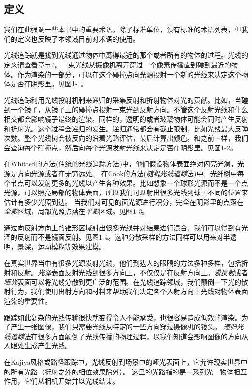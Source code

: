\documentclass[12pt]{article}
\begin{document}
\subsection{定义}
我们在此强调一些本书中的重要术语。除了标准单位，没有标准的术语列表，但我们的定义也反映了本领域目前对术语的使用。
 
光线追踪就是找到光线通过物体中离得最近的那个或者所有的物体的过程。光线的定义请查看章节2。一束光线从摄像机离开穿过一个像素传播直到碰到最近的物体。作为渲染的一部分，可以在这个碰撞点向光源投射一个新的光线来决定这个物体是否在阴影里。见图1-1。
 
光线追踪利用光线投射机制来递归的采集反射和折射物体对光的贡献。比如，当碰到一个镜子，从镜子上的碰撞点投射一束光到反射方向。不管这个反射光线和什么相交都会影响镜子最终的渲染。同样的，透明的或者玻璃物体可能会同时产生反射和折射光。这个过程会递归的发生。递归通常都会有截止限制，比如光线最大反弹次数。整个光线树会被反向的沿着光路评估，最后计算出颜色。和之前一样，我们会查询每个碰撞点，然后向每个光源发射光线来决定是否在阴影里。见图1-2。

在Whitted的方法(传统的光线追踪方法)中，他们假设物体表面绝对闪亮光滑，光源是方向光源或者在无穷远处。 在Cook的方法(\textit{随机光线追踪}法)中，光纤树中每个节点可以发射更多的光线以产生各种效果。比如想象一个球形光源而不是一个点光源，可以照亮局部的物体表面，所以我们可以射出很多光线到球上不同的位置来估计有多少光照到达。 当我们对可见的面光源进行积分，完全在阴影里的点落在\textit{全影}区域，局部光照点落在\textit{半影}区域。见图1-3。

通过向反射方向上的锥形区域射出很多光线并对结果进行混合，我们可以得到有光泽的反射而不是镜面反射。见图1-4。这种分散采样的方法同样可以用来对半透明，景深，运动模糊等效果建模。

在真实世界当中有很多光源发射光线，他们到达人的眼睛的方法多种多样，包括折射和反射。\textit{光泽}表面反射光线到很多方向上，不仅仅是在反射方向上。\textit{漫反射}或者\textit{哑光}表面可以将光线分散到更广泛的范围。在光线追踪领域，我们颠倒一下光的散射行为，我们使用出射方向和材料来帮助我们决定各个入射方向上光线对物体表面渲染的重要性。

跟踪如此复杂的光线传输很快就变得令人不能承受，也很容易造成低效的渲染。为了产生一张图像，我们只需要光线从特定的一些方向穿过摄像机的镜头。 \textit{递归光线追踪}法在很多方面颠倒了光线传播的物理过程，以我们知道会影响图像的方向从人眼处生成产生光线。

在Kajiya风格或路径跟踪中，光线反射到场景中的哑光表面上，它允许现实世界中的所有光路（衍射之外的相位效果除外）。 这里的光路指的是一系列光 - 物体相互作用，它们从相机开始并以光线结束。
\end{document}
